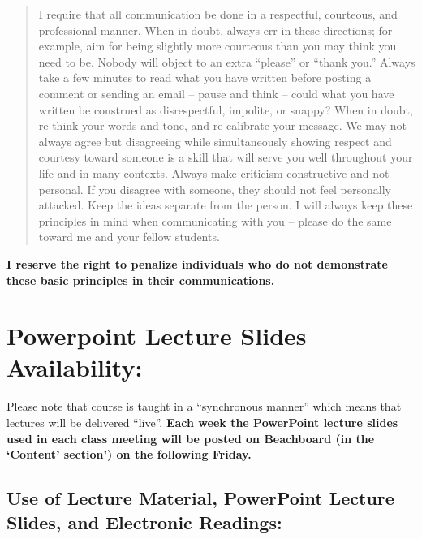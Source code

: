 \documentclass[11pt,]{article}
\begin{document}
\begin{itemize}
  \begin{quote}
  I require that all communication be done in a respectful, courteous,
  and professional manner. When in doubt, always err in these
  directions; for example, aim for being slightly more courteous than
  you may think you need to be. Nobody will object to an extra
  ``please'' or ``thank you.'' Always take a few minutes to read what
  you have written before posting a comment or sending an email -- pause
  and think -- could what you have written be construed as
  disrespectful, impolite, or snappy? When in doubt, re-think your words
  and tone, and re-calibrate your message. We may not always agree but
  disagreeing while simultaneously showing respect and courtesy toward
  someone is a skill that will serve you well throughout your life and
  in many contexts. Always make criticism constructive and not personal.
  If you disagree with someone, they should not feel personally
  attacked. Keep the ideas separate from the person. I will always keep
  these principles in mind when communicating with you -- please do the
  same toward me and your fellow students.
  \end{quote}
\end{itemize}

\textbf{I reserve the right to penalize individuals who do not
demonstrate these basic principles in their communications.}

\hypertarget{powerpoint-lecture-slides-availability}{%
\section{Powerpoint Lecture Slides
Availability:}\label{powerpoint-lecture-slides-availability}}

Please note that course is taught in a ``synchronous manner'' which
means that lectures will be delivered ``live''. \textbf{Each week the
PowerPoint lecture slides used in each class meeting will be posted on
Beachboard (in the `Content' section') on the following Friday.}

\hypertarget{use-of-lecture-material-powerpoint-lecture-slides-and-electronic-readings}{%
\subsection{Use of Lecture Material, PowerPoint Lecture Slides, and
Electronic
Readings:}\label{use-of-lecture-material-powerpoint-lecture-slides-and-electronic-readings}}
\end{document}
